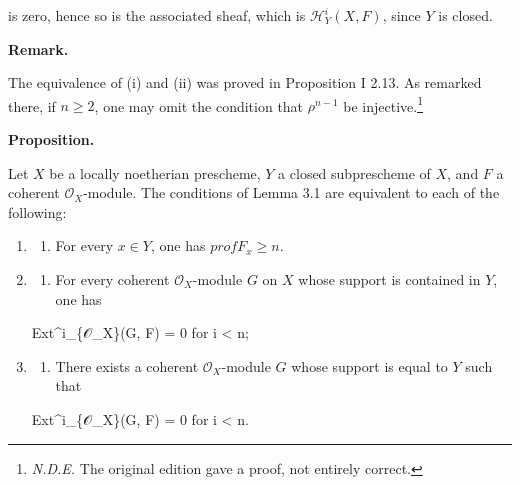 \documentclass[
]{article}
\newenvironment{Shaded}{}{}
\newcommand{\NormalTok}[1]{#1}
\providecommand{\tightlist}{%
  \setlength{\itemsep}{0pt}\setlength{\parskip}{0pt}}
\begin{document}
is zero, hence so is the associated sheaf, which is
\(\mathcal{H}^{i}_{Y}(X, F)\), since \(Y\) is closed.

\textbf{Remark.}

The equivalence of (i) and (ii) was proved in Proposition I 2.13. As
remarked there, if \(n \geqslant 2\), one may omit the condition that
\(\rho^{n-1}\) be injective.\footnote{\emph{N.D.E.} The original edition
  gave a proof, not entirely correct.}

\textbf{Proposition.}

Let \(X\) be a locally noetherian prescheme, \(Y\) a closed subprescheme
of \(X\), and \(F\) a coherent \(\mathcal{O}_{X}\)-module. The
conditions of Lemma 3.1 are equivalent to each of the following:

\begin{enumerate}
\def\labelenumi{\arabic{enumi}.}
\item
  \begin{enumerate}
  \def\labelenumii{(\roman{enumii})}
  \setcounter{enumii}{3}
  \tightlist
  \item
    For every \(x \in Y\), one has \(prof F_{x} \geqslant n\).
  \end{enumerate}
\item
  \begin{enumerate}
  \def\labelenumii{(\alph{enumii})}
  \setcounter{enumii}{21}
  \tightlist
  \item
    For every coherent \(\mathcal{O}_{X}\)-module \(G\) on \(X\) whose
    support is contained in \(Y\), one has
  \end{enumerate}

\begin{Shaded}
\begin{Highlighting}[]
\NormalTok{Ext\^{}i\_\{𝒪\_X\}(G, F) = 0 for i \textless{} n;}
\end{Highlighting}
\end{Shaded}
\item
  \begin{enumerate}
  \def\labelenumii{(\roman{enumii})}
  \setcounter{enumii}{5}
  \tightlist
  \item
    There exists a coherent \(\mathcal{O}_{X}\)-module \(G\) whose
    support is equal to \(Y\) such that
  \end{enumerate}

\begin{Shaded}
\begin{Highlighting}[]
\NormalTok{Ext\^{}i\_\{𝒪\_X\}(G, F) = 0 for i \textless{} n.}
\end{Highlighting}
\end{Shaded}
\end{enumerate}
\end{document}
